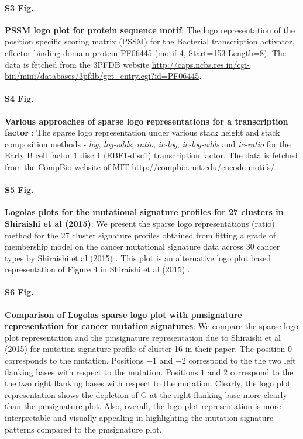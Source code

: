 \documentclass{bmcart}
\begin{document}
\begin{backmatter}
\paragraph*{S3 Fig.}
\label{fig:suppfig3}
\textbf{PSSM logo plot for protein sequence motif}: The logo representation of the position specific scoring matrix (PSSM) for the Bacterial transcription activator, effector binding domain protein PF06445 (motif 4, Start=153 Length=8). The data is fetched from the 3PFDB website \url{http://caps.ncbs.res.in/cgi-bin/mini/databases/3pfdb/get_entry.cgi?id=PF06445}. 
 

\paragraph*{S4 Fig.}
\label{fig:suppfig4}  
\textbf{Various approaches of sparse logo representations for a transcription factor} : The sparse logo representation under various stack height and stack composition methods - \textit{log}, \textit{log-odds}, \textit{ratio}, \textit{ic-log}, \textit{ic-log-odds} and \textit{ic-ratio} for the Early B cell factor 1 disc 1 (EBF1-disc1) transcription factor. The data is fetched from the CompBio website of MIT \url{http://compbio.mit.edu/encode-motifs/}.


\paragraph*{S5 Fig.}
\label{fig:suppfig5}   
\textbf{Logolas plots for the mutational signature profiles for 27 clusters in Shiraishi et al (2015)}: 
We present the sparse logo representations (ratio) method for the 27 cluster signature profiles obtained from fitting a grade of membership model on the cancer mutational signature data across 30 cancer types by Shiraishi et al (2015) \cite{Shiraishi2015}. This plot is an alternative logo plot based representation of Figure 4 in Shiraishi et al (2015) \cite{Shiraishi2015}. 

\paragraph*{S6 Fig.}
\label{fig:suppfig6}   
\textbf{Comparison of Logolas sparse logo plot with pmsignature representation for cancer mutation signatures}: 
We compare the sparse logo plot representation and the pmsignature representation due to Shiraishi et al (2015) \cite{Shiraishi2015} for mutation signature profile of cluster 16 in their paper. The position 0 corresponds to the mutation. Positions $-1$ and $-2$ correspond to the the two left flanking bases with respect to the mutation. Positions $1$ and $2$ correspond to the the two right flanking bases with respect to the mutation. Clearly, the logo plot representation shows the depletion of G at the right flanking base more clearly than the pmsignature plot. Also, overall, the logo plot representation is more interpretable and visually appealing in highlighting the mutation signature patterns compared to the pmsignature plot.


\end{backmatter}
\end{document}
